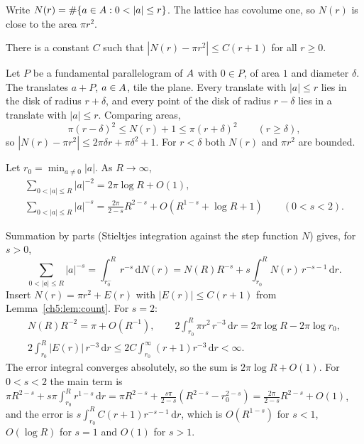 Write $N(r)=\#\{a\in\Lat:0<|a|\le r\}$. The lattice has covolume one, so $N(r)$ is close to the area $\pi r^2$.

\begin{lemma}\label{ch5:lem:count}
There is a constant $C$ such that $|N(r)-\pi r^2|\le C(r+1)$ for all $r\ge0$.
\end{lemma}

\begin{humanproof}
\tierC{} Let $P$ be a fundamental parallelogram of $A$ with $0\in P$, of area $1$ and diameter $\delta$. The
translates $a+P$, $a\in A$, tile the plane. Every translate with $|a|\le r$ lies in the disk of radius $r+\delta$,
and every point of the disk of radius $r-\delta$ lies in a translate with $|a|\le r$. Comparing areas,
\[
\pi(r-\delta)^2\le N(r)+1\le\pi(r+\delta)^2\qquad(r\ge\delta),
\]
so $|N(r)-\pi r^2|\le 2\pi\delta r+\pi\delta^2+1$. For $r<\delta$ both $N(r)$ and $\pi r^2$ are bounded.
\end{humanproof}

\begin{proposition}\label{ch5:prop:divrate}
Let $r_0=\min_{a\ne0}|a|$. As $R\to\infty$,
\begin{gather*}
\sum_{0<|a|\le R}|a|^{-2}=2\pi\log R+O(1),\\
\sum_{0<|a|\le R}|a|^{-s}=\frac{2\pi}{2-s}R^{2-s}+O(R^{1-s}+\log R+1)\qquad(0<s<2).
\end{gather*}
\end{proposition}

\begin{humanproof}
\tierC{} Summation by parts (Stieltjes integration against the step function $N$) gives, for $s>0$,
\[
\sum_{0<|a|\le R}|a|^{-s}=\int_{r_0^-}^{R}r^{-s}\,\mathrm{d}N(r)
=N(R)R^{-s}+s\int_{r_0}^{R}N(r)\,r^{-s-1}\,\mathrm{d}r .
\]
Insert $N(r)=\pi r^2+E(r)$ with $|E(r)|\le C(r+1)$ from Lemma~\ref{ch5:lem:count}. For $s=2$:
\begin{gather*}
N(R)R^{-2}=\pi+O(R^{-1}),\qquad
2\int_{r_0}^{R}\pi r^2\,r^{-3}\,\mathrm{d}r=2\pi\log R-2\pi\log r_0,\\
2\int_{r_0}^{R}|E(r)|\,r^{-3}\,\mathrm{d}r\le 2C\int_{r_0}^{\infty}(r+1)r^{-3}\,\mathrm{d}r<\infty .
\end{gather*}
The error integral converges absolutely, so the sum is $2\pi\log R+O(1)$. For $0<s<2$ the main term is
$\pi R^{2-s}+s\pi\int_{r_0}^{R}r^{1-s}\,\mathrm{d}r=\pi R^{2-s}+\frac{s\pi}{2-s}(R^{2-s}-r_0^{2-s})
=\frac{2\pi}{2-s}R^{2-s}+O(1)$, and the error is $s\int_{r_0}^R C(r+1)r^{-s-1}\,\mathrm{d}r$, which is $O(R^{1-s})$ for
$s<1$, $O(\log R)$ for $s=1$ and $O(1)$ for $s>1$.
\end{humanproof}

